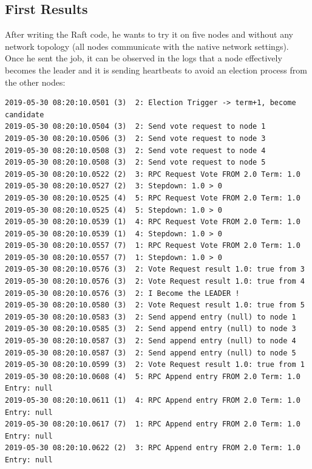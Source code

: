 \documentclass{eplmastersthesis}
\begin{document}
      \subsection{First Results}

        After writing the Raft code, he wants to try it on five nodes
        and without any network topology (all nodes communicate with the native network settings).\\
        Once he sent the job, it can be observed in the logs that a node
        effectively becomes the leader and it is sending heartbeats to avoid
        an election process from the other nodes:

        \begin{lstlisting}[style=MyLog]
2019-05-30 08:20:10.0501 (3)  2: Election Trigger -> term+1, become candidate
2019-05-30 08:20:10.0504 (3)  2: Send vote request to node 1
2019-05-30 08:20:10.0506 (3)  2: Send vote request to node 3
2019-05-30 08:20:10.0508 (3)  2: Send vote request to node 4
2019-05-30 08:20:10.0508 (3)  2: Send vote request to node 5
2019-05-30 08:20:10.0522 (2)  3: RPC Request Vote FROM 2.0 Term: 1.0
2019-05-30 08:20:10.0527 (2)  3: Stepdown: 1.0 > 0
2019-05-30 08:20:10.0525 (4)  5: RPC Request Vote FROM 2.0 Term: 1.0
2019-05-30 08:20:10.0525 (4)  5: Stepdown: 1.0 > 0
2019-05-30 08:20:10.0539 (1)  4: RPC Request Vote FROM 2.0 Term: 1.0
2019-05-30 08:20:10.0539 (1)  4: Stepdown: 1.0 > 0
2019-05-30 08:20:10.0557 (7)  1: RPC Request Vote FROM 2.0 Term: 1.0
2019-05-30 08:20:10.0557 (7)  1: Stepdown: 1.0 > 0
2019-05-30 08:20:10.0576 (3)  2: Vote Request result 1.0: true from 3
2019-05-30 08:20:10.0576 (3)  2: Vote Request result 1.0: true from 4
2019-05-30 08:20:10.0576 (3)  2: I Become the LEADER !
2019-05-30 08:20:10.0580 (3)  2: Vote Request result 1.0: true from 5
2019-05-30 08:20:10.0583 (3)  2: Send append entry (null) to node 1
2019-05-30 08:20:10.0585 (3)  2: Send append entry (null) to node 3
2019-05-30 08:20:10.0587 (3)  2: Send append entry (null) to node 4
2019-05-30 08:20:10.0587 (3)  2: Send append entry (null) to node 5
2019-05-30 08:20:10.0599 (3)  2: Vote Request result 1.0: true from 1
2019-05-30 08:20:10.0608 (4)  5: RPC Append entry FROM 2.0 Term: 1.0 Entry: null
2019-05-30 08:20:10.0611 (1)  4: RPC Append entry FROM 2.0 Term: 1.0 Entry: null
2019-05-30 08:20:10.0617 (7)  1: RPC Append entry FROM 2.0 Term: 1.0 Entry: null
2019-05-30 08:20:10.0622 (2)  3: RPC Append entry FROM 2.0 Term: 1.0 Entry: null
        \end{lstlisting}
\end{document}
